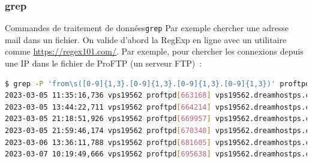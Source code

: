 \documentclass{beamer}
\begin{document}
    \subsubsection{grep}\label{subsubsec:grep}
    \begin{frame}[fragile]{Commandes de traitement de données}{\lstinline{grep}}
        Par exemple chercher une adresse mail dans un fichier.
        \bigbreak
        On valide d'abord la RegExp en ligne avec un utilitaire comme \url{https://regex101.com/}.
        \bigbreak
        Par exemple, pour chercher les connexions depuis une IP dans le fichier de ProFTP (un serveur FTP)~:
        \begin{lstlisting}[language=bash,basicstyle=\tiny\ttfamily]
$ grep -P 'from\s([0-9]{1,3}.[0-9]{1,3}.[0-9]{1,3}.[0-9]{1,3})' proftpd.log.1
2023-03-05 11:35:16,736 vps19562 proftpd[663168] vps19562.dreamhostps.com (104.156.155.30[104.156.155.30]): USER anonymous: no such user found from 104.156.155.30 [104.156.155.30] to~::ffff:66.33.201.239:21
2023-03-05 13:44:22,711 vps19562 proftpd[664214] vps19562.dreamhostps.com (183.127.77.34.bc.googleusercontent.com[34.77.127.183]): USER anonymous: no such user found from 183.127.77.34.bc.googleusercontent.com [34.77.127.183] to~::ffff:66.33.201.239:21
2023-03-05 21:18:51,926 vps19562 proftpd[669957] vps19562.dreamhostps.com (182.176.228.148[182.176.228.148]): USER local: no such user found from 182.176.228.148 [182.176.228.148] to~::ffff:66.33.201.239:21
2023-03-05 21:59:46,174 vps19562 proftpd[670340] vps19562.dreamhostps.com (107.150.102.211[107.150.102.211]): USER anonymous: no such user found from 107.150.102.211 [107.150.102.211] to~::ffff:66.33.201.239:21
2023-03-06 13:36:11,788 vps19562 proftpd[681605] vps19562.dreamhostps.com (116.62.233.35.bc.googleusercontent.com[35.233.62.116]): USER anonymous: no such user found from 116.62.233.35.bc.googleusercontent.com [35.233.62.116] to~::ffff:66.33.201.239:21
2023-03-07 10:19:49,666 vps19562 proftpd[695638] vps19562.dreamhostps.com (116.62.233.35.bc.googleusercontent.com[35.233.62.116]): USER anonymous: no such user found from 116.62.233.35.bc.googleusercontent.com [35.233.62.116] to~::ffff:66.33.201.239:21
        \end{lstlisting}
    \end{frame}
\end{document}
